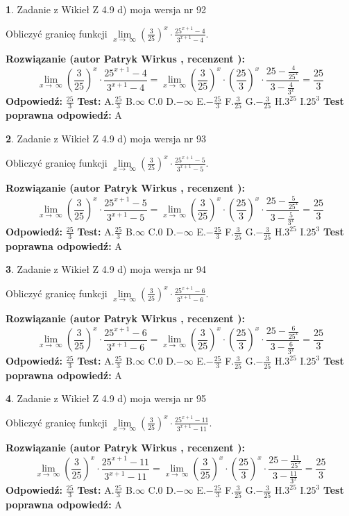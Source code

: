 \documentclass[12pt, a4paper]{article}
\theoremstyle{definition} %
\newtheorem{zad}{}
\newcommand{\zadStart}[1]{\begin{zad}#1\newline}
\newcommand{\zadStop}{\end{zad}}
\newcommand{\rozwStart}[2]{\noindent \textbf{Rozwiązanie (autor #1 , recenzent #2): }\newline}
\newcommand{\rozwStop}{\newline}
\newcommand{\odpStart}{\noindent \textbf{Odpowiedź:}\newline}
\newcommand{\odpStop}{\newline}
\newcommand{\testStart}{\noindent \textbf{Test:}\newline}
\newcommand{\testStop}{\newline}
\newcommand{\kluczStart}{\noindent \textbf{Test poprawna odpowiedź:}\newline}
\newcommand{\kluczStop}{\newline}
\begin{document}
\zadStart{Zadanie z Wikieł Z 4.9 d) moja wersja nr 92}


Obliczyć granicę funkcji  $\lim\limits_{x\to\ \infty}(\frac{3}{25})^{x}\cdot\frac{25^{x+1}-4}{3^{x+1}-4}$.
\zadStop
\rozwStart{Patryk Wirkus}{}
$$\lim\limits_{x\to\ \infty}(\frac{3}{25})^{x}\cdot\frac{25^{x+1}-4}{3^{x+1}-4}=\lim\limits_{x\to\ \infty}(\frac{3}{25})^{x}\cdot(\frac{25}{3})^{x} \cdot \frac{25-\frac{4}{25^{x}}}{3-\frac{4}{3^{x}}} = \frac{25}{3}$$
\rozwStop
\odpStart
$\frac{25}{3}$
\odpStop
\testStart
A.$\frac{25}{3}$ B.$\infty$ C.$0$ D.$-\infty$ E.$-\frac{25}{3}$
F.$\frac{3}{25}$ G.$-\frac{3}{25}$
H.$3^{25}$
I.$25^{3}$
\testStop
\kluczStart
A
\kluczStop



\zadStart{Zadanie z Wikieł Z 4.9 d) moja wersja nr 93}


Obliczyć granicę funkcji  $\lim\limits_{x\to\ \infty}(\frac{3}{25})^{x}\cdot\frac{25^{x+1}-5}{3^{x+1}-5}$.
\zadStop
\rozwStart{Patryk Wirkus}{}
$$\lim\limits_{x\to\ \infty}(\frac{3}{25})^{x}\cdot\frac{25^{x+1}-5}{3^{x+1}-5}=\lim\limits_{x\to\ \infty}(\frac{3}{25})^{x}\cdot(\frac{25}{3})^{x} \cdot \frac{25-\frac{5}{25^{x}}}{3-\frac{5}{3^{x}}} = \frac{25}{3}$$
\rozwStop
\odpStart
$\frac{25}{3}$
\odpStop
\testStart
A.$\frac{25}{3}$ B.$\infty$ C.$0$ D.$-\infty$ E.$-\frac{25}{3}$
F.$\frac{3}{25}$ G.$-\frac{3}{25}$
H.$3^{25}$
I.$25^{3}$
\testStop
\kluczStart
A
\kluczStop



\zadStart{Zadanie z Wikieł Z 4.9 d) moja wersja nr 94}


Obliczyć granicę funkcji  $\lim\limits_{x\to\ \infty}(\frac{3}{25})^{x}\cdot\frac{25^{x+1}-6}{3^{x+1}-6}$.
\zadStop
\rozwStart{Patryk Wirkus}{}
$$\lim\limits_{x\to\ \infty}(\frac{3}{25})^{x}\cdot\frac{25^{x+1}-6}{3^{x+1}-6}=\lim\limits_{x\to\ \infty}(\frac{3}{25})^{x}\cdot(\frac{25}{3})^{x} \cdot \frac{25-\frac{6}{25^{x}}}{3-\frac{6}{3^{x}}} = \frac{25}{3}$$
\rozwStop
\odpStart
$\frac{25}{3}$
\odpStop
\testStart
A.$\frac{25}{3}$ B.$\infty$ C.$0$ D.$-\infty$ E.$-\frac{25}{3}$
F.$\frac{3}{25}$ G.$-\frac{3}{25}$
H.$3^{25}$
I.$25^{3}$
\testStop
\kluczStart
A
\kluczStop



\zadStart{Zadanie z Wikieł Z 4.9 d) moja wersja nr 95}


Obliczyć granicę funkcji  $\lim\limits_{x\to\ \infty}(\frac{3}{25})^{x}\cdot\frac{25^{x+1}-11}{3^{x+1}-11}$.
\zadStop
\rozwStart{Patryk Wirkus}{}
$$\lim\limits_{x\to\ \infty}(\frac{3}{25})^{x}\cdot\frac{25^{x+1}-11}{3^{x+1}-11}=\lim\limits_{x\to\ \infty}(\frac{3}{25})^{x}\cdot(\frac{25}{3})^{x} \cdot \frac{25-\frac{11}{25^{x}}}{3-\frac{11}{3^{x}}} = \frac{25}{3}$$
\rozwStop
\odpStart
$\frac{25}{3}$
\odpStop
\testStart
A.$\frac{25}{3}$ B.$\infty$ C.$0$ D.$-\infty$ E.$-\frac{25}{3}$
F.$\frac{3}{25}$ G.$-\frac{3}{25}$
H.$3^{25}$
I.$25^{3}$
\testStop
\kluczStart
A
\kluczStop
\end{document}

